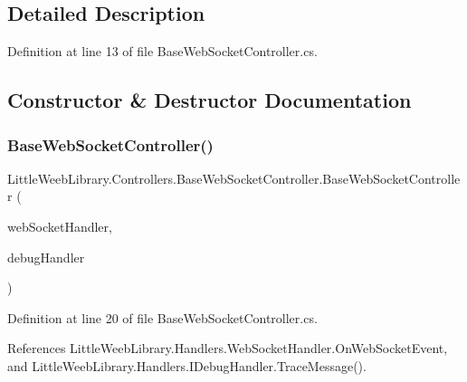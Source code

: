 \subsection{Detailed Description}


Definition at line 13 of file Base\+Web\+Socket\+Controller.\+cs.



\subsection{Constructor \& Destructor Documentation}
\mbox{\label{class_little_weeb_library_1_1_controllers_1_1_base_web_socket_controller_a0e9c1d617d9de0f8b1aec72078a81b18}} 
\subsubsection{\texorpdfstring{Base\+Web\+Socket\+Controller()}{BaseWebSocketController()}}
{\footnotesize\ttfamily Little\+Weeb\+Library.\+Controllers.\+Base\+Web\+Socket\+Controller.\+Base\+Web\+Socket\+Controller (\begin{DoxyParamCaption}\item[{\mbox{\hyperlink{interface_little_weeb_library_1_1_handlers_1_1_i_web_socket_handler}{I\+Web\+Socket\+Handler}}}]{web\+Socket\+Handler,  }\item[{\mbox{\hyperlink{interface_little_weeb_library_1_1_handlers_1_1_i_debug_handler}{I\+Debug\+Handler}}}]{debug\+Handler }\end{DoxyParamCaption})}



Definition at line 20 of file Base\+Web\+Socket\+Controller.\+cs.



References Little\+Weeb\+Library.\+Handlers.\+Web\+Socket\+Handler.\+On\+Web\+Socket\+Event, and Little\+Weeb\+Library.\+Handlers.\+I\+Debug\+Handler.\+Trace\+Message().


